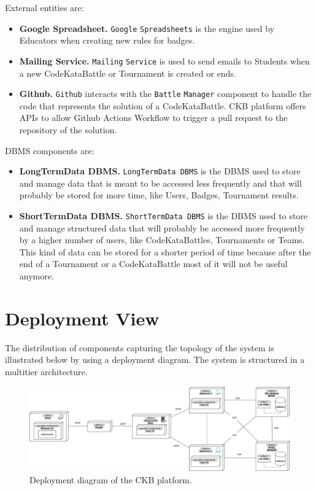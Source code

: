 External entities are:
\begin{itemize}
    \item \textbf{Google Spreadsheet.} \verb|Google| \verb|Spreadsheets| is the engine used by Educators when creating new rules for badges. 
    \item \textbf{Mailing Service.} \verb|Mailing| \verb|Service| is used to send emails to Students when a new CodeKataBattle or Tournament is created or ends.
    \item \textbf{Github.} \verb|Github| interacts with the \verb|Battle| \verb|Manager| component to handle the code that represents the solution of a CodeKataBattle. 
    CKB platform offers APIs to allow Github Actions Workflow to trigger a pull request to the repository of the solution.
\end{itemize}
DBMS components are:
\begin{itemize}
    \item \textbf{LongTermData DBMS.} \verb|LongTermData DBMS| is the DBMS used to store and manage data that is meant to be accessed less frequently and that will probably be stored for more time, like Users, Badges, Tournament results.
    \item \textbf{ShortTermData DBMS.} \verb|ShortTermData DBMS| is the DBMS used to store and manage structured data that will probably be accessed more frequently by a higher number of users, like CodeKataBattles, Tournaments or Teams. 
    This kind of data can be stored for a shorter period of time because after the end of a Tournament or a CodeKataBattle most of it will not be useful anymore.
\end{itemize}
\section{Deployment View}
\label{sec: deployment_view}%
The distribution of components capturing the topology of the system is illustrated below by using a deployment diagram.
The system is structured in a multitier architecture.
\newline
\begin{figure} [H]
    \begin{center}
        \includegraphics[width=1\linewidth]{Images/deployment_diag.png}
        \caption{Deployment diagram of the CKB platform.}
        \label{fig: depl_diagram}
    \end{center}
\end{figure}


